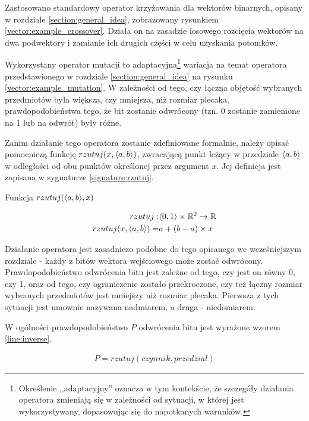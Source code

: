 \documentclass[./FM_mgr.tex]{subfiles}
\begin{document}
	Zastosowano standardowy operator krzyżowania dla wektorów binarnych, opisany w rozdziale \ref{section:general_idea}, zobrazowany rysunkiem \ref{vector:example_crossover}.
	Działa on na zasadzie losowego rozcięcia wektorów na dwa podwektory i zamianie ich drugich części w celu uzyskania potomków.
	
	Wykorzystany operator mutacji to adaptacyjna\footnote{
		Określenie ,,adaptacyjny'' oznacza w tym kontekście, że szczegóły działania operatora zmieniają się w zależności od sytuacji, w której jest wykorzystywany, dopasowując się do napotkanych warunków.
	} wariacja na temat operatora przedstawionego w rozdziale \ref{section:general_idea} na rysunku \ref{vector:example_mutation}.
	W zależności od tego, czy łączna objętość wybranych przedmiotów była większa, czy mniejsza, niż rozmiar plecaka, prawdopodobieństwa tego, że bit zostanie odwrócony (tzn. 0 zostanie zamienione na 1 lub na odwrót) były różne.
	
	Zanim działanie tego operatora zostanie zdefiniowane formalnie, należy opisać pomocniczą funkcję $rzutuj(x, \langle a, b\rangle)$, zwracającą punkt leżący w przedziale $\langle a, b\rangle$ w odległości od obu punktów określonej przez argument $x$.
	Jej definicja jest zapisana w sygnaturze \ref{signature:rzutuj}.
	
	\begin{signature}
		\caption{Funkcja $rzutuj(\langle a, b\rangle, x)$ \label{signature:rzutuj}}
		\begin{align}
		rzutuj: &\langle0, 1\rangle \times \mathbb{R}^2 \rightarrow \mathbb{R} \\
		rzutuj(x, \langle a, b\rangle) =& a + (b-a) \times x
		\end{align}
	\end{signature}
	
	Działanie operatora jest zasadniczo podobne do tego opisanego we wcześniejszym rozdziale - każdy z bitów wektora wejściowego może zostać odwrócony.
	Prawdopodobieństwo odwrócenia bitu jest zależne od tego, czy jest on równy 0, czy 1, oraz od tego, czy ograniczenie zostało przekroczone, czy też łączny rozmiar wybranych przedmiotów jest mniejszy niż rozmiar plecaka.
	Pierwsza z tych sytuacji jest umownie nazywana nadmiarem, a druga - niedomiarem.
	
	W ogólności prawdopodobieństwo $P$ odwrócenia bitu jest wyrażone wzorem \ref{line:inverse}.
	
	\begin{align}
	\label{line:inverse}
	P = rzutuj(czynnik, przedzial)
	\end{align}
	
\end{document}
